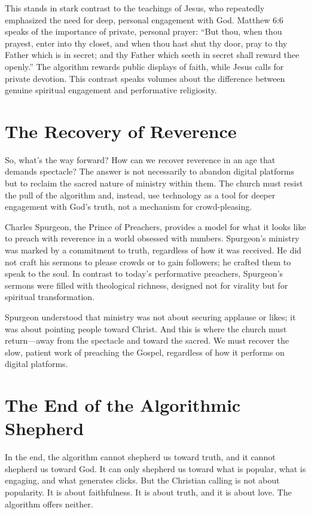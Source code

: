 \documentclass[a4paper,11pt]{book}
\begin{document}
This stands in stark contrast to the teachings of Jesus, who repeatedly emphasized the need for deep, personal engagement with God. Matthew 6:6 speaks of the importance of private, personal prayer: “But thou, when thou prayest, enter into thy closet, and when thou hast shut thy door, pray to thy Father which is in secret; and thy Father which seeth in secret shall reward thee openly.” The algorithm rewards public displays of faith, while Jesus calls for private devotion. This contrast speaks volumes about the difference between genuine spiritual engagement and performative religiosity.

\section{The Recovery of Reverence}

So, what’s the way forward? How can we recover reverence in an age that demands spectacle? The answer is not necessarily to abandon digital platforms but to reclaim the sacred nature of ministry within them. The church must resist the pull of the algorithm and, instead, use technology as a tool for deeper engagement with God’s truth, not a mechanism for crowd-pleasing.

Charles Spurgeon, the Prince of Preachers, provides a model for what it looks like to preach with reverence in a world obsessed with numbers. Spurgeon’s ministry was marked by a commitment to truth, regardless of how it was received. He did not craft his sermons to please crowds or to gain followers; he crafted them to speak to the soul. In contrast to today’s performative preachers, Spurgeon’s sermons were filled with theological richness, designed not for virality but for spiritual transformation.

Spurgeon understood that ministry was not about securing applause or likes; it was about pointing people toward Christ. And this is where the church must return—away from the spectacle and toward the sacred. We must recover the slow, patient work of preaching the Gospel, regardless of how it performs on digital platforms.

\section{The End of the Algorithmic Shepherd}

In the end, the algorithm cannot shepherd us toward truth, and it cannot shepherd us toward God. It can only shepherd us toward what is popular, what is engaging, and what generates clicks. But the Christian calling is not about popularity. It is about faithfulness. It is about truth, and it is about love. The algorithm offers neither.
\end{document}

